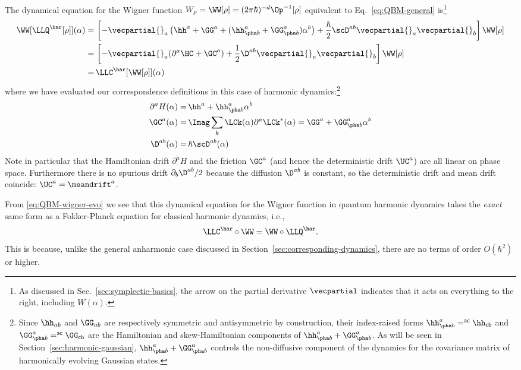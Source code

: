 \documentclass{article}
\numberwithin{equation}{section}
\begin{document}
The dynamical equation for the Wigner function $W_\rho=\WW[\rho]=(2\pi\hbar)^{-d}\Op^{-1}[\rho]$ equivalent to Eq.~\eqref{eq:QBM-general} is\footnote{As discussed in Sec.~\ref{sec:symplectic-basics}, the arrow on the partial derivative $\vecpartial$ indicates that it acts on everything to the right, including $W(\alpha)$.}
\begin{align} \label{eq:QBM-wigner-evo}
    \WW[\LLQ^{\har}[\rho]](\alpha)
    =&\, \left[-\vecpartial{}_a\left(\hh^a+\GG^a + (\hh^a_{\pha b} + \GG^a_{\pha b})  \alpha^b\right) + \frac{\hbar}{2}\scD^{ab}\vecpartial{}_a \vecpartial{}_b \right]
    \WW[\rho]
    \\
    =&\, \left[-\vecpartial{}_a(\partial^a\HC +\GC^a) + \frac{1}{2}\D^{ab}\vecpartial{}_a \vecpartial{}_b \right]
    \WW[\rho]
    \\
    =&\,
    \LLC^{\har}[\WW[\rho]](\alpha)
\end{align}
where we have evaluated our correspondence definitions in this case of harmonic dynamics:\footnote{Since $\hh_{ab}$ and $\GG_{ab}$ are respectively symmetric and antisymmetric by construction, their index-raised forms $\hh^{a}_{\pha b} = \sf^{ac}\hh_{cb}$ and $\GG^{a}_{\pha b} = \sf^{ac}\GG_{cb}$ are the Hamiltonian and skew-Hamiltonian components of $\hh^{a}_{\pha b} + \GG^{a}_{\pha b}$.  As will be seen in Section~\ref{sec:harmonic-gaussian}, $\hh^{a}_{\pha b} + \GG^{a}_{\pha b}$ controls the non-diffusive component of the dynamics for the covariance matrix of harmonically evolving Gaussian states.}
\begin{align} 
    \partial^a H(\alpha) = \, & \hh^a+\hh^a_{\pha b}\alpha^b\\
    \GC^a(\alpha) = \, & \Imag \sum_k \LCk(\alpha) \partial^a \LCk^*(\alpha) = \GG^a + \GG^a_{\pha b}\alpha^b\\
    \D^{ab}(\alpha) = \, & \hbar\scD^{ab}(\alpha) 
\end{align}
Note in particular that the Hamiltonian drift $\partial^a H$ and the friction $\GC^a$ (and hence the deterministic drift $\UC^a$) are all linear on phase space. Furthermore there is no spurious drift $\partial_b \D^{ab}/2$ because the diffusion $\D^{ab}$ is constant, so the deterministic drift and mean drift coincide: $\UC^a = \meandrift^a$. 

From \eqref{eq:QBM-wigner-evo} we see that this dynamical equation for the Wigner function in quantum harmonic dynamics takes the \emph{exact} same form as a Fokker-Planck equation for classical harmonic dynamics, i.e., 
\begin{align}\label{eq:harmonic-equivalence}
    \LLC^{\har}\circ\WW =\WW\circ\LLQ^{\har}. 
\end{align}
This is because, unlike the general anharmonic case discussed in Section~\ref{sec:corresponding-dynamics}, there are no terms of order $O(\hbar^2)$ or higher. 
\end{document}
